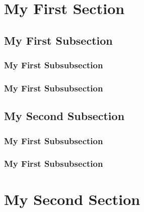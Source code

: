 \documentclass{article}
\begin{document}
  \section{My First Section}
  \label{sec:section 1}
  \subsection{My First Subsection}
  \label{sec:subsection 1.1}
  \subsubsection{My First Subsubsection}
  \label{sec:subsubsection 1.1.1}
  \subsubsection{My First Subsubsection}
  \label{sec:subsubsection 1.1.2}
  \subsection{My Second Subsection}
  \label{sec:subsection 1.2}
  \subsubsection{My First Subsubsection}
  \label{sec:subsubsection 1.2.1}
  \subsubsection{My First Subsubsection}
  \label{sec:subsubsection 1.2.2}
  \section{My Second Section}
  \label{sec:section 2}
\end{document}
